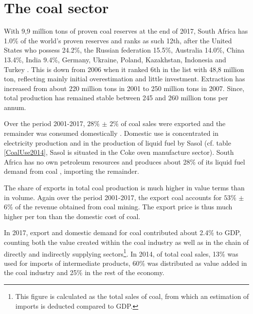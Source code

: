 \documentclass[12pt,english]{article}
\begin{document}
\section{The coal sector}\label{key_sectors}

With 9,9 million tons of proven coal reserves at the end of 2017, South Africa has 1.0\% of the world's proven reserves and ranks as such 12th, after the United States who possess 24.2\%, the Russian federation 15.5\%, Australia 14.0\%, China 13.4\%, India 9.4\%, Germany, Ukraine, Poland, Kazakhstan, Indonesia and Turkey . %
This is down from 2006 when it ranked 6th in the list with 48,8 million ton, reflecting mainly initial overestimation and little investment. Extraction has increased from about 220 million tons in 2001 to 250 million tons in 2007. Since, total production has remained stable between 245 and 260 million tons per annum.  %

Over the period 2001-2017, $28\%$ $\pm$ $2\%$ of coal sales were exported and the remainder was consumed domestically . Domestic use is concentrated in electricity production and in the production of liquid fuel by Sasol (cf. table \ref{CoalUse2014}, Sasol is situated in the Coke oven manufacture sector). South Africa has no own petroleum resources and produces about 28\% of its liquid fuel demand from coal \citep{coal2013DoE}, importing the remainder. 

The share of exports in total coal production is much higher in value terms than in volume. Again over the period 2001-2017, the export coal accounts for $53\%$ $\pm$ $6\%$ of the revenue obtained from coal mining. The export price is thus much higher per ton than the domestic cost of coal.

In 2017, export and domestic demand for coal contributed about 2.4\% to GDP, counting both the value created within the coal industry as well as in the chain of directly and indirectly supplying sectors\footnote{This figure is calculated as the total sales of coal, from which an estimation of imports is deducted compared to GDP.}. In 2014, of total coal sales, 13\% was used for imports of intermediate products, 60\% was distributed as value added in the coal industry and 25\% in the rest of the economy.
\end{document}
